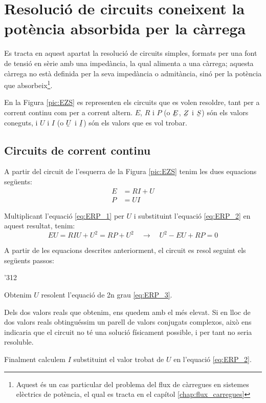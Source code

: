 \section{Resolució de circuits coneixent la potència absorbida per la
càrrega}\label{sec:EZS}

Es tracta en aquest apartat la resolució de circuits simples,
formats per una font de tensió en sèrie amb una impedància, la qual
alimenta a una càrrega; aquesta càrrega no està definida per la seva
impedància o admitància, sinó per la potència que absorbeix\footnote{Aquest és un cas particular
del problema del flux de càrregues en
sistemes elèctrics de potència, el qual es tracta en el capítol \ref{chap:flux_carregues}}.

En la Figura \vref{pic:EZS} es representen els circuits que es volen
resoldre, tant per a corrent continu com per a corrent altern. $E$,
$R$ i $P$ (o $\cmplx{E}$, $\cmplx{Z}$ i $\cmplx{S}$) són els valors
coneguts, i $U$ i $I$ (o $\cmplx{U}$ i $\cmplx{I}$) són els valors
que es vol trobar.

\begin{center}
   
     \label{pic:EZS}
\end{center}

\subsection{Circuits de corrent continu}

A partir del circuit de l'esquerra de la Figura \vref{pic:EZS} tenim les dues equacions següents:
\begin{align}
   E &= R I + U \label{eq:ERP_1} \\
   P &= U I     \label{eq:ERP_2}
\end{align}

Multiplicant l'equació \eqref{eq:ERP_1} per $U$ i substituint l'equació \eqref{eq:ERP_2} en aquest resultat, tenim:
\begin{equation}
   E U = R I U + U^2 = R P + U^2 \quad \rightarrow \quad U^2 - E U + R P = 0 \label{eq:ERP_3}
\end{equation}

A partir de les equacions descrites anteriorment, el circuit es resol seguint els següents passos:
\begin{dingautolist}{'312}
   \item Obtenim $U$ resolent l'equació de 2n grau \eqref{eq:ERP_3}.
   \item Dels dos valors reals que obtenim, ens quedem amb el més elevat. Si en lloc de dos valors reals obtinguéssim
   un parell de valors conjugats complexos, això ens indicaria que el circuit no té una solució físicament possible, i per tant no seria resoluble.
   \item Finalment calculem $I$ substituint el valor trobat de $U$ en l'equació \eqref{eq:ERP_2}.
\end{dingautolist}

